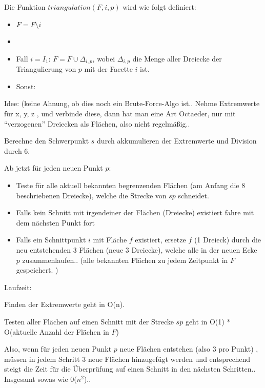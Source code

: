 \documentclass[a4paper]{article}
\begin{document}
\begin{enumerate}
\begin{itemize}
	\end{itemize}		
\end{enumerate}

Die Funktion $triangulation(F,i,p)$ wird wie folgt definiert:

\begin{itemize}
	\item $F = F \setminus i$
	\item 
	\item Fall $i = I_1$: $F = F \cup \Delta_{i,p}$, wobei $\Delta_{i,p}$ die Menge aller Dreiecke der Triangulierung von $p$ mit der Facette $i$ ist.
	\item Sonst: 
\end{itemize}

Idee: (keine Ahnung, ob dies noch ein Brute-Force-Algo ist..
Nehme Extremwerte für x, y, z , und verbinde diese, 
dann hat man eine Art Octaeder, nur mit "`verzogenen"' Dreiecken als Flächen, also nicht regelmäßig..


Berechne den Schwerpunkt $s$ durch akkumulieren der Extremwerte und Division durch 6.

Ab jetzt für jeden neuen Punkt $p$:

\begin{itemize}
	\item Teste für alle aktuell bekannten begrenzenden Flächen (am Anfang die 8
	beschriebenen Dreiecke), welche die Strecke
	von $\overline{sp}$ schneidet. 
	\item Falls kein Schnitt mit irgendeiner der Flächen (Dreiecke) existiert fahre mit dem nächsten Punkt fort
	\item Falls ein Schnittpunkt $i$ mit Fläche $f$ existiert, ersetze $f$ (1 Dreieck) durch
	die neu entstehenden 3 Flächen (neue 3 Dreiecke), welche alle in der neuen Ecke $p$
	zusammenlaufen.. (alle bekannten Flächen zu jedem Zeitpunkt in $F$ gespeichert. )
\end{itemize}

Laufzeit:

Finden der Extremwerte geht in O(n).

Testen aller Flächen auf einen Schnitt mit der Strecke $\overline{sp}$ geht in O(1) *
O(aktuelle Anzahl der Flächen in $F$)

Also, wenn für jeden neuen Punkt $p$ neue Flächen entstehen (also 3 pro Punkt) , 
müssen in jedem Schritt 3 neue Flächen hinzugefügt werden und entsprechend steigt
die Zeit für die Überprüfung auf einen Schnitt in den nächsten Schritten..
Insgesamt sowas wie 0($n^2$)..
\end{document}
